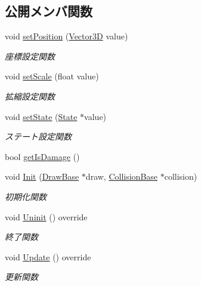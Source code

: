 \subsection*{公開メンバ関数}
\begin{DoxyCompactItemize}
\item 
void \mbox{\hyperlink{class_needle_adbc39e74035a9379aad3c09a1933b3e3}{set\+Position}} (\mbox{\hyperlink{class_vector3_d}{Vector3D}} value)
\begin{DoxyCompactList}\small\item\em 座標設定関数 \end{DoxyCompactList}\item 
void \mbox{\hyperlink{class_needle_a496ac6f8e6bc0b6ea639cfe1294ee4ea}{set\+Scale}} (float value)
\begin{DoxyCompactList}\small\item\em 拡縮設定関数 \end{DoxyCompactList}\item 
void \mbox{\hyperlink{class_needle_a76b35c7ddffb5de4c44daa66e5927baa}{set\+State}} (\mbox{\hyperlink{class_needle_1_1_state}{State}} $\ast$value)
\begin{DoxyCompactList}\small\item\em ステート設定関数 \end{DoxyCompactList}\item 
bool \mbox{\hyperlink{class_needle_aabdce3968b99467237da733a262b00f0}{get\+Is\+Damage}} ()
\item 
void \mbox{\hyperlink{class_needle_a3b0e0e86944e85bfb283de011c7ce8a2}{Init}} (\mbox{\hyperlink{class_draw_base}{Draw\+Base}} $\ast$draw, \mbox{\hyperlink{class_collision_base}{Collision\+Base}} $\ast$collision)
\begin{DoxyCompactList}\small\item\em 初期化関数 \end{DoxyCompactList}\item 
void \mbox{\hyperlink{class_needle_a077c40beda665b249522349df0f16da1}{Uninit}} () override
\begin{DoxyCompactList}\small\item\em 終了関数 \end{DoxyCompactList}\item 
void \mbox{\hyperlink{class_needle_adf4790c9ad674b809ae576a09a3ee2f2}{Update}} () override
\begin{DoxyCompactList}\small\item\em 更新関数 \end{DoxyCompactList}\end{DoxyCompactItemize}

